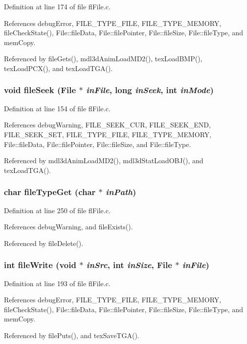 Definition at line 174 of file fl\-File.c.

References debug\-Error, FILE\_\-TYPE\_\-FILE, FILE\_\-TYPE\_\-MEMORY, file\-Check\-State(), File::file\-Data, File::file\-Pointer, File::file\-Size, File::file\-Type, and mem\-Copy.

Referenced by file\-Gets(), mdl3d\-Anim\-Load\-MD2(), tex\-Load\-BMP(), tex\-Load\-PCX(), and tex\-Load\-TGA().
\subsubsection{\setlength{\rightskip}{0pt plus 5cm}void file\-Seek ({\bf File} $\ast$ {\em in\-File}, long {\em in\-Seek}, int {\em in\-Mode})}\label{flFile_8h_e5232070b4bd85cfcbeee00f4e8e32a4}




Definition at line 154 of file fl\-File.c.

References debug\-Warning, FILE\_\-SEEK\_\-CUR, FILE\_\-SEEK\_\-END, FILE\_\-SEEK\_\-SET, FILE\_\-TYPE\_\-FILE, FILE\_\-TYPE\_\-MEMORY, File::file\-Data, File::file\-Pointer, File::file\-Size, and File::file\-Type.

Referenced by mdl3d\-Anim\-Load\-MD2(), mdl3d\-Stat\-Load\-OBJ(), and tex\-Load\-TGA().
\subsubsection{\setlength{\rightskip}{0pt plus 5cm}char file\-Type\-Get (char $\ast$ {\em in\-Path})}\label{flFile_8h_702afef29c951ec19b533d9109bbc155}




Definition at line 250 of file fl\-File.c.

References debug\-Warning, and file\-Exists().

Referenced by file\-Delete().
\subsubsection{\setlength{\rightskip}{0pt plus 5cm}int file\-Write (void $\ast$ {\em in\-Src}, int {\em in\-Size}, {\bf File} $\ast$ {\em in\-File})}\label{flFile_8h_2c30646df4736c414f5017339780ea82}




Definition at line 193 of file fl\-File.c.

References debug\-Error, FILE\_\-TYPE\_\-FILE, FILE\_\-TYPE\_\-MEMORY, file\-Check\-State(), File::file\-Data, File::file\-Pointer, File::file\-Size, File::file\-Type, and mem\-Copy.

Referenced by file\-Puts(), and tex\-Save\-TGA().